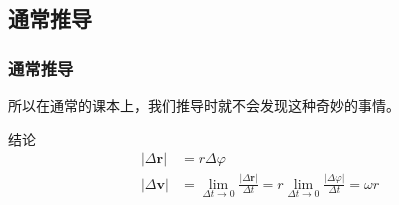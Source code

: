 \documentclass{beamer}
\begin{document}
\begin{CJK}{UTF8}{hei}
\subsection{通常推导}
    \begin{frame}
    \frametitle{通常推导}
    所以在通常的课本上，我们推导时就不会发现这种奇妙的事情。
    \begin{block}{结论}
    \begin{align}
    |\Delta \mathbf{r}|&=r\Delta\varphi \\
    |\Delta \mathbf{v}|&=\lim_{\Delta t \rightarrow 0} \frac{|\Delta \mathbf{r}|}{\Delta t}= r \lim_{\Delta t \rightarrow 0}\frac{|\Delta \varphi|}{\Delta t}= \omega r
    \end{align}
    \end{block}
    \end{frame}

\end{CJK}
\end{document}
